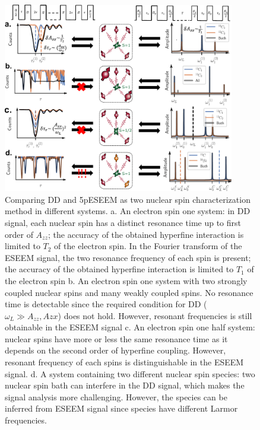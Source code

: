 \documentclass[%
 reprint,
superscriptaddress,
 amsmath,amssymb,
 aps,
]{revtex4-2}
\begin{document}
\begin{figure}%
	\begin{center}
		\includegraphics[width=0.9\textwidth]{pict/drawing0.pdf}
		\caption{Comparing DD and 5pESEEM as two nuclear spin characterization method in different systems. a. An electron spin one system: in DD signal, each nuclear spin has a distinct resonance time up to first order of $A_{zz}$; the accuracy of the obtained hyperfine interaction is limited to $T_2$ of the electron spin. In the Fourier transform of the ESEEM signal, the two resonance frequency of each spin is present; the accuracy of the obtained hyperfine interaction is limited to $T_1$ of the electron spin b. An electron spin one system with two strongly coupled nuclear spins and many weakly coupled spins. No resonance time is detectable since the required condition for DD ($\omega_L \gg A_{zz}, A{zx}$) does not hold. However, resonant frequencies is still obtainable in the ESEEM signal c. An electron spin one half system: nuclear spins have more or less the same resonance time as it depends on the second order of hyperfine coupling. However, resonant frequency of each spins is distinguishable in the ESEEM signal. d. A system containing two different nuclear spin species: two nuclear spin bath can interfere in the DD signal, which makes the signal analysis more challenging. However, the species can be inferred from ESEEM signal since species have different Larmor frequencies.}
		\label{fig:1}
	\end{center}
\end{figure}
\end{document}

